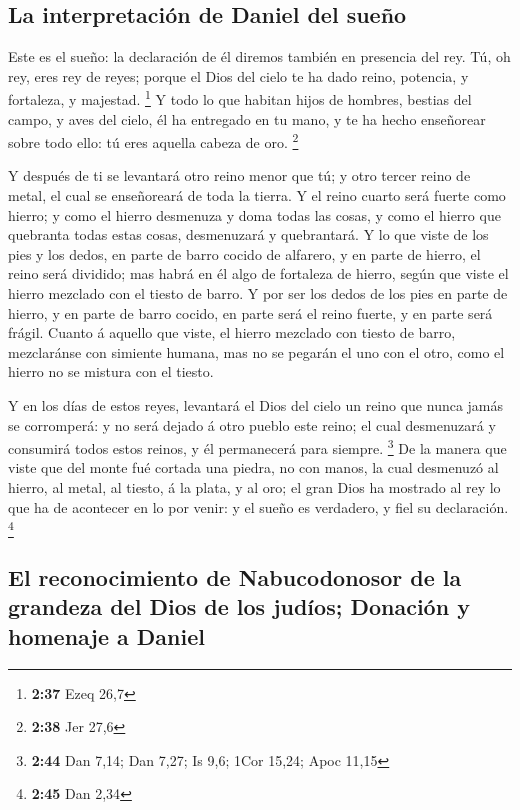 \hypertarget{la-interpretaciuxf3n-de-daniel-del-sueuxf1o}{%
\subsection{La interpretación de Daniel del
sueño}\label{la-interpretaciuxf3n-de-daniel-del-sueuxf1o}}

 Este es el sueño: la declaración de él diremos también en
presencia del rey.  Tú, oh rey, eres rey de reyes; porque
el Dios del cielo te ha dado reino, potencia, y fortaleza, y majestad.
\footnote{\textbf{2:37} Ezeq 26,7}  Y todo lo que habitan
hijos de hombres, bestias del campo, y aves del cielo, él ha entregado
en tu mano, y te ha hecho enseñorear sobre todo ello: tú eres aquella
cabeza de oro. \footnote{\textbf{2:38} Jer 27,6}

 Y después de ti se levantará otro reino menor que tú; y
otro tercer reino de metal, el cual se enseñoreará de toda la tierra.
 Y el reino cuarto será fuerte como hierro; y como el
hierro desmenuza y doma todas las cosas, y como el hierro que quebranta
todas estas cosas, desmenuzará y quebrantará.  Y lo que
viste de los pies y los dedos, en parte de barro cocido de alfarero, y
en parte de hierro, el reino será dividido; mas habrá en él algo de
fortaleza de hierro, según que viste el hierro mezclado con el tiesto de
barro.  Y por ser los dedos de los pies en parte de hierro,
y en parte de barro cocido, en parte será el reino fuerte, y en parte
será frágil.  Cuanto á aquello que viste, el hierro
mezclado con tiesto de barro, mezclaránse con simiente humana, mas no se
pegarán el uno con el otro, como el hierro no se mistura con el tiesto.

 Y en los días de estos reyes, levantará el Dios del cielo
un reino que nunca jamás se corromperá: y no será dejado á otro pueblo
este reino; el cual desmenuzará y consumirá todos estos reinos, y él
permanecerá para siempre. \footnote{\textbf{2:44} Dan 7,14; Dan 7,27; Is
  9,6; 1Cor 15,24; Apoc 11,15}  De la manera que viste que
del monte fué cortada una piedra, no con manos, la cual desmenuzó al
hierro, al metal, al tiesto, á la plata, y al oro; el gran Dios ha
mostrado al rey lo que ha de acontecer en lo por venir: y el sueño es
verdadero, y fiel su declaración. \footnote{\textbf{2:45} Dan 2,34}

\hypertarget{el-reconocimiento-de-nabucodonosor-de-la-grandeza-del-dios-de-los-juduxedos-donaciuxf3n-y-homenaje-a-daniel}{%
\subsection{El reconocimiento de Nabucodonosor de la grandeza del Dios
de los judíos; Donación y homenaje a
Daniel}\label{el-reconocimiento-de-nabucodonosor-de-la-grandeza-del-dios-de-los-juduxedos-donaciuxf3n-y-homenaje-a-daniel}}

